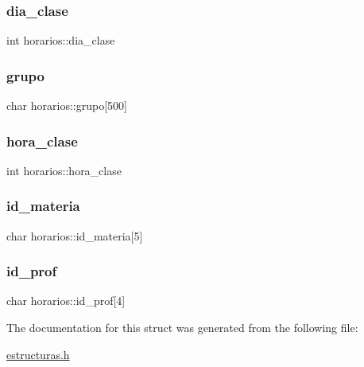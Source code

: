 \subsubsection{\texorpdfstring{dia\+\_\+clase}{dia\_clase}}
{\footnotesize\ttfamily int horarios\+::dia\+\_\+clase}

\mbox{\label{structhorarios_a435f7d8029b65cba591011c6d86ce284}} 
\subsubsection{\texorpdfstring{grupo}{grupo}}
{\footnotesize\ttfamily char horarios\+::grupo\mbox{[}500\mbox{]}}

\mbox{\label{structhorarios_a5ed630f7244ecfbe4c29f08ffb009472}} 
\subsubsection{\texorpdfstring{hora\+\_\+clase}{hora\_clase}}
{\footnotesize\ttfamily int horarios\+::hora\+\_\+clase}

\mbox{\label{structhorarios_adbe2c73c92199ce4ac6e03b7cdbe9b72}} 
\subsubsection{\texorpdfstring{id\+\_\+materia}{id\_materia}}
{\footnotesize\ttfamily char horarios\+::id\+\_\+materia\mbox{[}5\mbox{]}}

\mbox{\label{structhorarios_a10531356ac4d127379c96ad1006873f8}} 
\subsubsection{\texorpdfstring{id\+\_\+prof}{id\_prof}}
{\footnotesize\ttfamily char horarios\+::id\+\_\+prof\mbox{[}4\mbox{]}}



The documentation for this struct was generated from the following file\+:\begin{DoxyCompactItemize}
\item 
\mbox{\hyperlink{estructuras_8h}{estructuras.\+h}}\end{DoxyCompactItemize}

